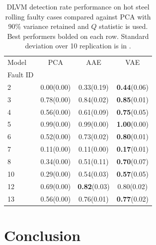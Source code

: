 \documentclass{scrartcl}
\theoremstyle{definition}
\begin{document}
\begin{table}[t]
    
    \caption{DLVM detection rate performance on hot steel rolling faulty cases compared against PCA with 90\% variance retained and $Q$ statistic is used. Best performers bolded on each row. Standard deviation over 10 replication is in 	.}
    \renewcommand{\arraystretch}{1.3}
    \begin{tabular}{lccc}
    \toprule
    Model &           PCA &      AAE &      VAE \\
    Fault ID &               &               &               \\
    \midrule
    2                &  0.00(0.00) &  0.33(0.19) &  \textbf{0.44}(0.06) \\
    3                &  0.78(0.00) &  0.84(0.02) &  \textbf{0.85}(0.01) \\
    4                &  0.56(0.00) &  0.61(0.09) &  \textbf{0.75}(0.05) \\
    5                &  0.99(0.00) &  0.99(0.00) &  \textbf{1.00}(0.00) \\
    6                &  0.52(0.00) &  0.73(0.02) &  \textbf{0.80}(0.01) \\
    7                &  0.11(0.00) &  0.11(0.00) &  \textbf{0.17}(0.01) \\
    8                &  0.34(0.00) &  0.51(0.11) &  \textbf{0.70}(0.07) \\
    10               &  0.29(0.00) &  0.54(0.03) &  \textbf{0.57}(0.05) \\
    12               &  0.69(0.00) &  \textbf{0.82}(0.03) &  0.80(0.02) \\
    13               &  0.56(0.00) &  0.76(0.01) &  \textbf{0.77}(0.02) \\
    \bottomrule
    \end{tabular}
    \label{tab:rolling:vsPCA}
\end{table}


\section{Conclusion}
\label{sec:conclusions}

\printbibliography



\appendix
{}
\end{document}

